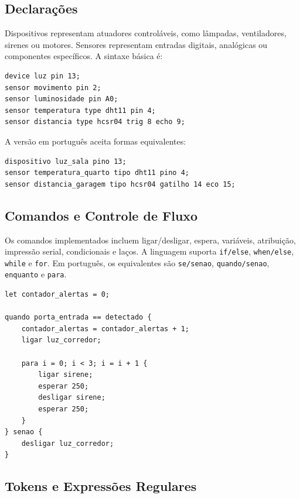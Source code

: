 \documentclass[conference]{IEEEtran}
\begin{document}
\subsection{Declarações}

Dispositivos representam atuadores controláveis, como lâmpadas, ventiladores, sirenes ou motores. Sensores representam entradas digitais, analógicas ou componentes específicos. A sintaxe básica é:

\begin{lstlisting}[style=homescript]
device luz pin 13;
sensor movimento pin 2;
sensor luminosidade pin A0;
sensor temperatura type dht11 pin 4;
sensor distancia type hcsr04 trig 8 echo 9;
\end{lstlisting}

A versão em português aceita formas equivalentes:

\begin{lstlisting}[style=homescript]
dispositivo luz_sala pino 13;
sensor temperatura_quarto tipo dht11 pino 4;
sensor distancia_garagem tipo hcsr04 gatilho 14 eco 15;
\end{lstlisting}

\subsection{Comandos e Controle de Fluxo}

Os comandos implementados incluem ligar/desligar, espera, variáveis, atribuição, impressão serial, condicionais e laços. A linguagem suporta \texttt{if/else}, \texttt{when/else}, \texttt{while} e \texttt{for}. Em português, os equivalentes são \texttt{se/senao}, \texttt{quando/senao}, \texttt{enquanto} e \texttt{para}.

\begin{lstlisting}[style=homescript,caption={Trecho de automação residencial completa.},label={lst:complete}]
let contador_alertas = 0;

quando porta_entrada == detectado {
    contador_alertas = contador_alertas + 1;
    ligar luz_corredor;

    para i = 0; i < 3; i = i + 1 {
        ligar sirene;
        esperar 250;
        desligar sirene;
        esperar 250;
    }
} senao {
    desligar luz_corredor;
}
\end{lstlisting}

\subsection{Tokens e Expressões Regulares}
\end{document}
